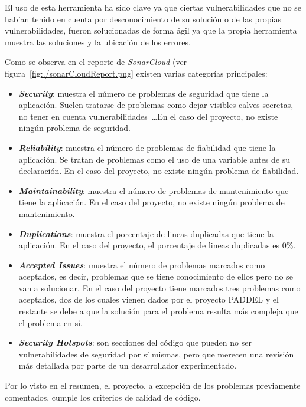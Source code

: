 El uso de esta herramienta ha sido clave ya que ciertas vulnerabilidades que no se habían tenido en cuenta por desconocimiento de su solución o de las propias vulnerabilidades, fueron solucionadas de forma ágil ya que la propia herramienta muestra las soluciones y la ubicación de los errores.


Como se observa en el reporte de \textit{SonarCloud} (ver figura~\ref{fig:./sonarCloudReport.png} existen varias categorías principales:
\begin{itemize}
\item \textit{\textbf{Security}}: muestra el número de problemas de seguridad que tiene la aplicación. Suelen tratarse de problemas como dejar visibles calves secretas, no tener en cuenta vulnerabilidades~\ldots En el caso del proyecto, no existe ningún problema de seguridad.
\item \textit{\textbf{Reliability}}: muestra el número de problemas de fiabilidad que tiene la aplicación. Se tratan de problemas como el uso de una variable antes de su declaración. En el caso del proyecto, no existe ningún problema de fiabilidad.
\item \textit{\textbf{Maintainability}}: muestra el número de problemas de mantenimiento que tiene la aplicación. En el caso del proyecto, no existe ningún problema de mantenimiento.
\item \textit{\textbf{Duplications}}: muestra el porcentaje de lineas duplicadas que tiene la aplicación. En el caso del proyecto, el porcentaje de lineas duplicadas es 0\%.
\item \textit{\textbf{Accepted Issues}}: muestra el número de problemas marcados como aceptados, es decir, problemas que se tiene conocimiento de ellos pero no se van a solucionar. En el caso del proyecto tiene marcados tres problemas como aceptados, dos de los cuales vienen dados por el proyecto PADDEL y el restante se debe a que la solución para el problema resulta más compleja que el problema en sí.
\item \textit{\textbf{Security Hotspots}}: son secciones del código que pueden no ser vulnerabilidades de seguridad por sí mismas, pero que merecen una revisión más detallada por parte de un desarrollador experimentado.
\end{itemize}

Por lo visto en el resumen, el proyecto, a excepción de los problemas previamente comentados, cumple los criterios de calidad de código.


